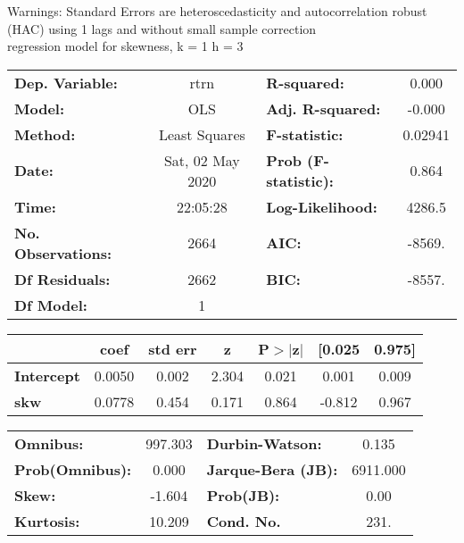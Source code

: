 Warnings: \newline
 [1] Standard Errors are heteroscedasticity and autocorrelation robust (HAC) using 1 lags and without small sample correction\\ 

regression model for skewness, k = 1 h = 3\begin{center}
\begin{tabular}{lclc}
\toprule
\textbf{Dep. Variable:}    &       rtrn       & \textbf{  R-squared:         } &     0.000   \\
\textbf{Model:}            &       OLS        & \textbf{  Adj. R-squared:    } &    -0.000   \\
\textbf{Method:}           &  Least Squares   & \textbf{  F-statistic:       } &   0.02941   \\
\textbf{Date:}             & Sat, 02 May 2020 & \textbf{  Prob (F-statistic):} &    0.864    \\
\textbf{Time:}             &     22:05:28     & \textbf{  Log-Likelihood:    } &    4286.5   \\
\textbf{No. Observations:} &        2664      & \textbf{  AIC:               } &    -8569.   \\
\textbf{Df Residuals:}     &        2662      & \textbf{  BIC:               } &    -8557.   \\
\textbf{Df Model:}         &           1      & \textbf{                     } &             \\
\bottomrule
\end{tabular}
\begin{tabular}{lcccccc}
                   & \textbf{coef} & \textbf{std err} & \textbf{z} & \textbf{P$> |$z$|$} & \textbf{[0.025} & \textbf{0.975]}  \\
\midrule
\textbf{Intercept} &       0.0050  &        0.002     &     2.304  &         0.021        &        0.001    &        0.009     \\
\textbf{skw}       &       0.0778  &        0.454     &     0.171  &         0.864        &       -0.812    &        0.967     \\
\bottomrule
\end{tabular}
\begin{tabular}{lclc}
\textbf{Omnibus:}       & 997.303 & \textbf{  Durbin-Watson:     } &    0.135  \\
\textbf{Prob(Omnibus):} &   0.000 & \textbf{  Jarque-Bera (JB):  } & 6911.000  \\
\textbf{Skew:}          &  -1.604 & \textbf{  Prob(JB):          } &     0.00  \\
\textbf{Kurtosis:}      &  10.209 & \textbf{  Cond. No.          } &     231.  \\
\bottomrule
\end{tabular}
\end{center}

